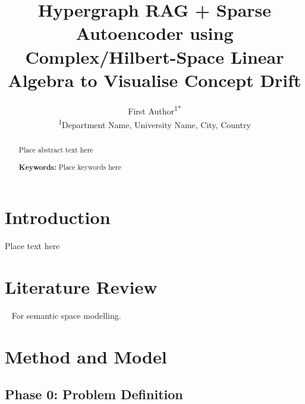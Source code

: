 \documentclass[twoside,10pt]{article}
\title{\fontsize{16}{20}\selectfont\textbf{Hypergraph RAG + Sparse Autoencoder using Complex/Hilbert-Space Linear Algebra to Visualise Concept Drift}}
\author{
    \fontsize{12}{14}\selectfont
    First Author\textsuperscript{1*} \\
    \fontsize{12}{14}\selectfont
    \textsuperscript{1}Department Name, University Name, City, Country 
}
\date{}
\newcommand{\keywordsname}{Keywords}
\newenvironment{keywords}
  {\par\noindent\hspace{2em}\textbf{\keywordsname:}}
  {\par}
\begin{document}
\vspace{-0.5cm}  %
\raggedright%

{\fontsize{11}{13}\selectfont{Research Article}}
\vspace{-0.8cm}  %


\thispagestyle{firstpage} %
\begin{abstract}
\fontsize{11}{13}\selectfont
\vspace{1em}
\justifying%
Place abstract text here

\vspace{-0.1cm}
\begin{keywords}
Place keywords here
\end{keywords}

\end{abstract}

\vspace{1cm}

\section{Introduction}
\fontsize{12}{14}\selectfont
Place text here

\section{Literature Review}
\fontsize{12}{14}\selectfont
~\cite{laine2025quantumllm} For semantic space modelling.

\section{Method and Model}
\subsection{Phase 0: Problem Definition}
\fontsize{12}{14}\selectfont
\end{document}
